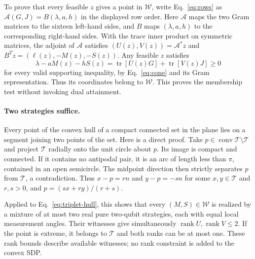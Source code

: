 \documentclass[11pt]{article}
\theoremstyle{remark}\newtheorem{remark}[theorem]{Remark}
\newcommand{\tr}{\operatorname{tr}}\newcommand{\Q}{\mathcal Q}
\newcommand{\W}{\mathcal W}\newcommand{\sxdeg}{\operatorname{sxdeg}}
\begin{document}
To prove that every feasible $z$ gives a point in $\W$, write Eq.~\eqref{eq:rows} as
$\mathcal A(G,J)=B(\lambda,a,h)$ in the displayed row order.
Here $\mathcal A$ maps the two Gram matrices to the sixteen left-hand sides,
and $B$ maps $(\lambda,a,h)$ to the corresponding right-hand sides.
With the trace inner product on symmetric matrices, the adjoint of
$\mathcal A$ satisfies $(U(z),V(z))=\mathcal A^*z$ and
$B^Tz=(\ell(z),-M(z),-S(z))$. Any feasible $z$ satisfies
\[
 \lambda-aM(z)-hS(z)=\tr[U(z)G]+\tr[V(z)J]\ge0
\]
for every valid supporting inequality, by Eq.~\eqref{eq:cone} and its Gram
representation. Thus its coordinates belong to $\W$. This proves the
membership test without invoking dual attainment.

\paragraph{Two strategies suffice.}
Every point of the convex hull of a compact connected set in the plane
lies on a segment joining two points of the set. Here is a direct proof.
Take $p\in\operatorname{conv}\mathcal T\setminus\mathcal T$ and project
$\mathcal T$ radially onto the unit circle about $p$. Its image is compact
and connected. If it contains no antipodal pair, it is an arc of length
less than $\pi$, contained in an open semicircle. The midpoint direction
then strictly separates $p$ from $\mathcal T$, a contradiction.
Thus $x-p=r n$ and $y-p=-s n$ for some $x,y\in\mathcal T$ and $r,s>0$,
and $p=(s x+r y)/(r+s)$.

Applied to Eq.~\eqref{eq:triplet-hull}, this shows that every $(M,S)\in\W$
is realized by a mixture of at most two real pure two-qubit strategies,
each with equal local measurement angles. Their witnesses give simultaneously
$\operatorname{rank}U,\operatorname{rank}V\le2$.
If the point is extreme, it belongs to $\mathcal T$ and both ranks can be
at most one. These rank bounds describe available witnesses; no rank
constraint is added to the convex SDP.
\end{document}
